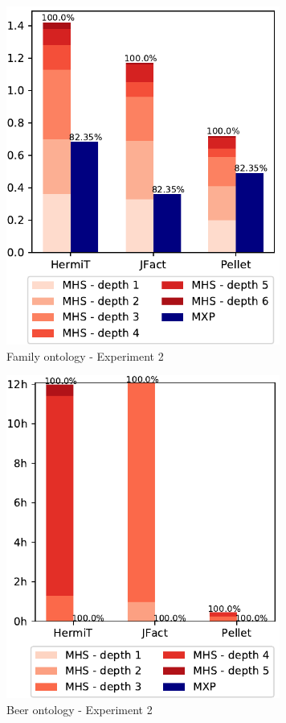 \documentclass[12pt,a4paper]{article}
\begin{document}
\begin{figure}[H]
	\centering
	\includegraphics[width=9cm]{eval2Family} 	
	\caption{Family ontology - Experiment 2}
	\label{fig:eval2Family}
\end{figure}

\begin{figure}[H]
	\centering
	\includegraphics[width=9cm]{eval2Beer} 
	\caption{Beer ontology - Experiment 2}
	\label{fig:eval2Beer}
\end{figure}
\end{document}
